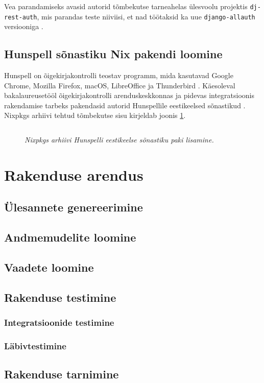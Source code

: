 Vea parandamiseks avasid autorid tõmbekutse tarneahelas ülesvoolu projektis \texttt{dj-rest-auth}, mis parandas teste niiviisi, et nad töötaksid ka uue \texttt{django-allauth} versiooniga \cite{dj-rest-pr}.

\subsection{Hunspell sõnastiku Nix pakendi loomine}

Hunspell on õigekirjakontrolli teostav programm, mida kasutavad Google Chrome, Mozilla Firefox, macOS, LibreOffice ja Thunderbird \cite{hunspell}.
Käesoleval bakalaureusetööl õigekirjakontrolli arenduskeskkonnas ja pidevas integratsioonis rakendamise tarbeks pakendasid autorid Hunspellile eestikeelsed sõnastikud \cite{hunspell-pr}. Nixpkgs arhiivi tehtud tõmbekutse sisu kirjeldab joonis \ref{fig:hunspell-pr}.

\begin{figure}
\inputminted[breaklines]{diff}{chapters/data/hunspell.diff}
\caption{\emph{Nixpkgs arhiivi Hunspelli eestikeelse sõnastiku paki lisamine.}}\label{fig:hunspell-pr}
\end{figure}
\clearpage

\section{Rakenduse arendus}

\subsection{Ülesannete genereerimine}

\subsection{Andmemudelite loomine}

\subsection{Vaadete loomine}

\subsection{Rakenduse testimine}

\subsubsection{Integratsioonide testimine}

\subsubsection{Läbivtestimine}

\subsection{Rakenduse tarnimine}\label{subsec:cicd}

